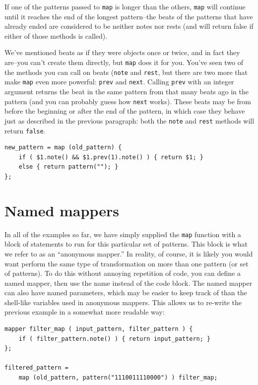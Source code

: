 If one of the patterns passed to {\tt map} is longer than the others, {\tt map} will continue until it reaches the end of the longest pattern--the beats of the patterns that have already ended are considered to be neither notes nor rests (and will return false if either of those methods is called).

We've mentioned beats as if they were objects once or twice, and in fact they are--you can't create them directly, but {\tt map} does it for you.  You've seen two of the methods you can call on beats ({\tt note} and {\tt rest}, but there are two more that make {\tt map} even more powerful:  {\tt prev} and {\tt next}.
Calling {\tt prev} with an integer argument returns the beat in the same pattern from that many beats ago in the pattern (and you can probably guess how {\tt next} works).  These beats may be from before the beginning or after the end of the pattern, in which case they behave just as described in the previous paragraph: both the {\tt note} and {\tt rest} methods will return {\tt false}.

\begin{lstlisting}
new_pattern = map (old_pattern) {
	if ( $1.note() && $1.prev(1).note() ) { return $1; }
	else { return pattern(""); }
};
\end{lstlisting}

\section{Named mappers}\label{tu:namedmap}

In all of the examples so far, we have simply supplied the {\tt map} function with a block of statements to run for this particular set of patterns.  This block is what we refer to as an ``anonymous mapper.''  In reality, of course, it is likely you would want perform the same type of transformation on more than one pattern (or set of patterns).  To do this without annoying repetition of code, you can define a named mapper, then use the name instead of the code block.  The named mapper can also have named parameters, which may be easier to keep track of than the shell-like variables used in anonymous mappers.  This allows us to re-write the previous example in a somewhat more readable way:
\begin{lstlisting}
mapper filter_map ( input_pattern, filter_pattern ) {
	if ( filter_pattern.note() ) { return input_pattern; }
};

filtered_pattern =
	map (old_pattern, pattern("1110011110000") ) filter_map;
\end{lstlisting}




